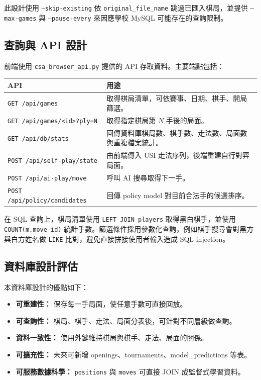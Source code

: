 \documentclass[12pt,a4paper,fontset=none]{ctexart}
\begin{document}
此設計使用 \texttt{--skip-existing} 依 \texttt{original\_file\_name} 跳過已匯入棋局，並提供 \texttt{--max-games} 與 \texttt{--pause-every} 來因應學校 MySQL 可能存在的查詢限制。

\subsection{查詢與 API 設計}
前端使用 \texttt{csa\_browser\_api.py} 提供的 API 存取資料。主要端點包括：

\begin{longtable}{p{}p{}}
\toprule
\textbf{API} & \textbf{用途}\\
\midrule
\endhead
\texttt{GET /api/games} & 取得棋局清單，可依賽事、日期、棋手、開局篩選。\\
\texttt{GET /api/games/<id>?ply=N} & 取得指定棋局第 $N$ 手後的局面。\\
\texttt{GET /api/db/stats} & 回傳資料庫棋局數、棋手數、走法數、局面數與重複檔案統計。\\
\texttt{POST /api/self-play/state} & 由前端傳入 USI 走法序列，後端重建自行對弈局面。\\
\texttt{POST /api/ai-play/move} & 呼叫 AI 搜尋取得下一手。\\
\texttt{POST /api/policy/candidates} & 回傳 policy model 對目前合法手的候選排序。\\
\bottomrule
\end{longtable}

在 SQL 查詢上，棋局清單使用 \texttt{LEFT JOIN players} 取得黑白棋手，並使用 \texttt{COUNT(m.move\_id)} 統計手數。篩選條件採用參數化查詢，例如棋手搜尋會對黑方與白方姓名做 \texttt{LIKE} 比對，避免直接拼接使用者輸入造成 SQL injection。

\subsection{資料庫設計評估}
本資料庫設計的優點如下：

\begin{itemize}
  \item \textbf{可重建性：} 保存每一手局面，使任意手數可直接回放。
  \item \textbf{可查詢性：} 棋局、棋手、走法、局面分表後，可針對不同層級做查詢。
  \item \textbf{資料一致性：} 使用外鍵維持棋局與棋手、走法、局面的關係。
  \item \textbf{可擴充性：} 未來可新增 openings、tournaments、model\_predictions 等表。
  \item \textbf{可服務數據科學：} \texttt{positions} 與 \texttt{moves} 可直接 JOIN 成監督式學習資料。
\end{itemize}
\end{document}
